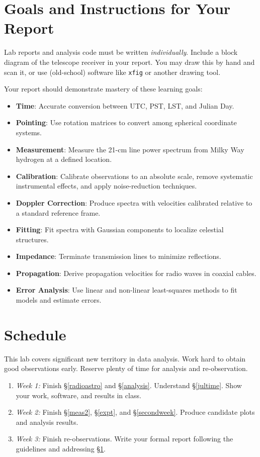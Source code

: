 \documentclass[11pt,preprint]{aastex}
\begin{document}
\section{Goals and Instructions for Your Report} \label{sec:goals}


\noindent
Lab reports and analysis code must be written {\it individually}.
Include a block diagram of the telescope receiver in your report.
You may draw this by hand and scan it, or use (old-school) software like {\tt xfig} or
another drawing tool.

Your report should demonstrate mastery of these learning goals:

\begin{itemize}
    \item {\bf Time}: Accurate conversion between UTC, PST, LST, and Julian Day.
    \item {\bf Pointing}: Use rotation matrices to convert among spherical
    coordinate systems.
    \item {\bf Measurement}: Measure the 21-cm line power spectrum from
    Milky Way hydrogen at a defined location.
    \item {\bf Calibration}: Calibrate observations to an absolute scale,
    remove systematic instrumental effects, and apply noise-reduction techniques.
    \item {\bf Doppler Correction}: Produce spectra with velocities calibrated
    relative to a standard reference frame.
    \item {\bf Fitting}: Fit spectra with Gaussian components to localize
    celestial structures.
    \item {\bf Impedance}: Terminate transmission lines to minimize reflections.
    \item {\bf Propagation}: Derive propagation velocities for radio waves
    in coaxial cables.
    \item {\bf Error Analysis}: Use linear and non-linear least-squares methods
    to fit models and estimate errors.
\end{itemize}


\section{Schedule}


\noindent
This lab covers significant new territory in data analysis.
Work hard to obtain good observations early.
Reserve plenty of time for analysis and re-observation.

\begin{enumerate}
    \item {\it Week 1:} Finish \S\ref{radioastro} and \S \ref{analysis}.
    Understand \S \ref{jultime}.
    Show your work, software, and results in class.

    \item {\it Week 2:} Finish \S \ref{meas2}, \S \ref{expt}, and \S \ref{secondweek}.
    Produce candidate plots and analysis results.

    \item {\it Week 3:} Finish re-observations.
    Write your formal report following the guidelines and addressing
    \S\ref{sec:goals}.
\end{enumerate}
\end{document}
